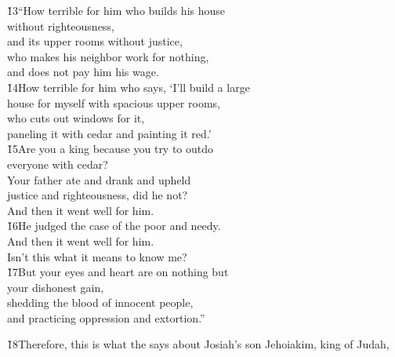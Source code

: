 \begin{poetry}
\poeml \v{13}``How terrible for him who builds his house \\
\poemll    without righteousness, \\
\poeml and its upper rooms without justice, \\
\poemll    who makes his neighbor work for nothing, \\
\poemll    and does not pay him his wage. \\
\poeml \v{14}How terrible for him who says, `I'll build a large \\
\poemll    house for myself with spacious upper rooms, \\
\poeml who cuts out windows for it, \\
\poemll    paneling it with cedar and painting it red.' \\
\poeml \v{15}Are you a king because you try to outdo \\
\poemll    everyone with cedar? \\
\poeml Your father ate and drank and upheld \\
\poemll    justice and righteousness, did he not? \\
\poemlll       And then it went well for him. \\
\poeml \v{16}He judged the case of the poor and needy. \\
\poemll    And then it went well for him. \\
\poemlll       Isn't this what it means to know me? \\
\poeml \v{17}But your eyes and heart are on nothing but \\
\poemll    your dishonest gain, \\
\poeml shedding the blood of innocent people, \\
\poemll    and practicing oppression and extortion.''
\end{poetry}

\v{18}Therefore, this is what the  says about Josiah's son Jehoiakim, king of Judah,

